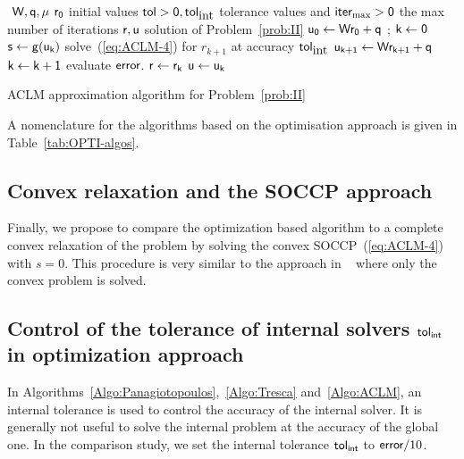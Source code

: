 \begin{algorithm}
  \begin{algorithmic}
    {\sf
      \STATE $ $ 
      \REQUIRE $\sf W,q,\mu$
      \REQUIRE $\sf r_0$ initial values
      \REQUIRE $\sf tol >0, tol_{\mbox{int}}$  tolerance values and $\sf iter_{\max}  >0$ the max number of iterations
      \ENSURE  $\sf r,u$ solution of Problem~\ref{prob:II}
      \STATE $\sf u_{0} \leftarrow W r_0 + q $ ; $\sf k \leftarrow 0$ 
      \STATE $\sf s \leftarrow g(u_{k})$ 
      \STATE solve~(\ref{eq:ACLM-4}) for $r_{k+1}$ at accuracy $\sf tol_{\mbox{int}}$
      \STATE $\sf u_{k+1} \leftarrow W r_{k+1} + q$ 
      \STATE $\sf k \leftarrow k+1$
      \STATE evaluate $\sf error$.
      \ENDWHILE
      \STATE $\sf r \leftarrow r_{k}$ 
      \STATE $\sf u \leftarrow u_k$ 
    }
  \end{algorithmic}
  \caption{ACLM approximation algorithm for Problem~\ref{prob:II}}
  \label{Algo:ACLM}
\end{algorithm}

A nomenclature for the algorithms based on the optimisation approach is given in Table~\ref{tab:OPTI-algos}.
\subsection{Convex relaxation and the SOCCP approach}

Finally, we propose to compare the optimization based algorithm to a complete convex relaxation of the problem by solving the convex SOCCP~(\ref{eq:ACLM-4}) with $s=0$. This procedure is very similar to the approach in ~\cite{Tasora.Anistescu_CMAME2009,Anistescu.Tasora_COA2010,Tasora.Anistescu_CMAME2011} where only the convex problem is  solved.


\subsection{Control of the tolerance of internal solvers $\sf tol_{{int}}$ in optimization approach}

In Algorithms~\ref{Algo:Panagiotopoulos},~\ref{Algo:Tresca} and~\ref{Algo:ACLM}, an internal tolerance is used to control the accuracy of the internal solver. It is generally not useful to solve the internal problem at the accuracy of the global one. In the comparison study, we set the internal tolerance $\sf tol_{{int}}$ to $ {\sf error}/10$.

